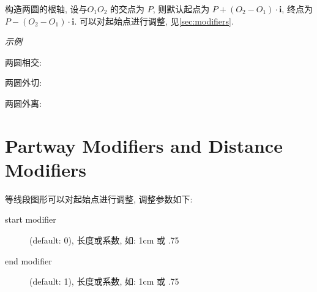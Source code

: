 构造两圆的根轴, 设与$O_1O_2$ 的交点为 $P$, 则默认起点为 $P+(O_2-O_1) \cdot \mathbf{i}$, 终点为 $P-(O_2-O_1) \cdot \mathbf{i}$.
可以对起始点进行调整, 见\ref{sec:modifiers}.

\emph{示例}

两圆相交:


两圆外切:


两圆外离:


\section{Partway Modifiers and Distance Modifiers}%

等线段图形可以对起始点进行调整, 调整参数如下\cite{CALC}:

\begin{description}
  \item[start modifier] (default: 0), 长度或系数, 如: 1cm 或 .75
  \item[end modifier] (default: 1), 长度或系数, 如: 1cm 或 .75
\end{description}

